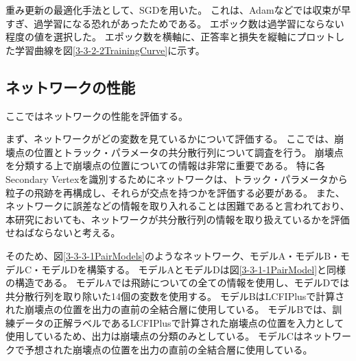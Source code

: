 重み更新の最適化手法として、SGDを用いた。
これは、Adamなどでは収束が早すぎ、過学習になる恐れがあったためである。
エポック数は過学習にならない程度の値を選択した。
エポック数を横軸に、正答率と損失を縦軸にプロットした学習曲線を図\ref{3-3-2-2TrainingCurve}に示す。



\subsection{ネットワークの性能} \label{Net:PM:PerformanceofPM}

ここではネットワークの性能を評価する。

まず、ネットワークがどの変数を見ているかについて評価する。
ここでは、崩壊点の位置とトラック・パラメータの共分散行列について調査を行う。
崩壊点を分類する上で崩壊点の位置についての情報は非常に重要である。
特に各Secondary Vertexを識別するためにネットワークは、トラック・パラメータから粒子の飛跡を再構成し、それらが交点を持つかを評価する必要がある。
また、ネットワークに誤差などの情報を取り入れることは困難であると言われており、本研究においても、ネットワークが共分散行列の情報を取り扱えているかを評価せねばならないと考える。

そのため、図\ref{3-3-3-1PairModels}のようなネットワーク、モデルA・モデルB・モデルC・モデルDを構築する。
モデルAとモデルDは図\ref{3-3-1-1PairModel}と同様の構造である。
モデルAでは飛跡についての全ての情報を使用し、モデルDでは共分散行列を取り除いた14個の変数を使用する。
モデルBはLCFIPlusで計算された崩壊点の位置を出力の直前の全結合層に使用している。
モデルBでは、訓練データの正解ラベルであるLCFIPlusで計算された崩壊点の位置を入力として使用しているため、出力は崩壊点の分類のみとしている。
モデルCはネットワークで予想された崩壊点の位置を出力の直前の全結合層に使用している。

